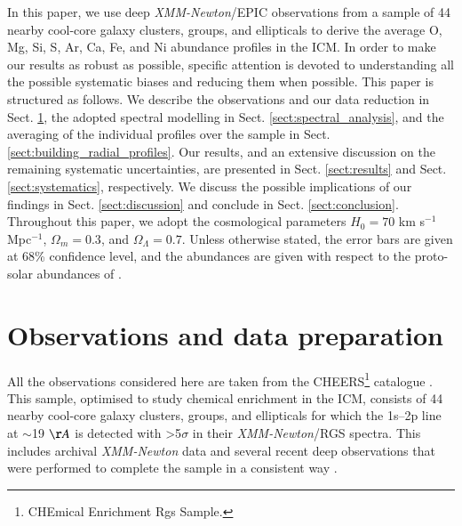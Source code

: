\documentclass{aa}
\begin{document}
In this paper, we use deep \textit{XMM-Newton}/EPIC observations from a sample of 44 nearby cool-core galaxy clusters, groups, and ellipticals to derive the average O, Mg, Si, S, Ar, Ca, Fe, and Ni abundance profiles in the ICM. In order to make our results as robust as possible, specific attention is devoted to understanding all the possible systematic biases and reducing them when possible. This paper is structured as follows. We describe the observations and our data reduction in Sect. \ref{sect:data_reduction}, the adopted spectral modelling in Sect. \ref{sect:spectral_analysis}, and the averaging of the individual profiles over the sample in Sect. \ref{sect:building_radial_profiles}. Our results, and an extensive discussion on the remaining systematic uncertainties, are presented in Sect. \ref{sect:results} and Sect. \ref{sect:systematics}, respectively. We discuss the possible implications of our findings in Sect. \ref{sect:discussion} and conclude in Sect. \ref{sect:conclusion}. Throughout this paper, we adopt the cosmological parameters $H_0 = 70$ km s$^{-1}$ Mpc$^{-1}$, $\Omega_m = 0.3$, and $\Omega_\Lambda = 0.7$. Unless otherwise stated, the error bars are given at 68\% confidence level, and the abundances are given with respect to the proto-solar abundances of \citet{2009LanB...4B...44L}.


















\section{Observations and data preparation}\label{sect:data_reduction}


All the observations considered here are taken from the CHEERS\footnote{CHEmical Enrichment Rgs Sample.} catalogue \citep[][]{dePlaa2017,2016A&A...592A.157M}. This sample, optimised to study chemical enrichment in the ICM, consists of 44 nearby cool-core galaxy clusters, groups, and ellipticals for which the  1s--2p line at $\sim$19 $\AA$ is detected with >5$\sigma$ in their \textit{XMM-Newton}/RGS spectra. This includes archival \textit{XMM-Newton} data and several recent deep observations that were performed to complete the sample in a consistent way \citep{dePlaa2017}.
\end{document}

